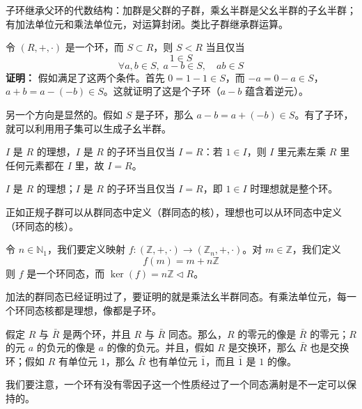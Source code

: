 \begin{note}[定义2 6子环]
子环继承父环的代数结构：加群是父群的子群，乘幺半群是父幺半群的子幺半群；有加法单位元和乘法单位元，对运算封闭。类比子群继承群运算。
\end{note}

\begin{lemma}[引理 2.1：子环等价条件]
令 $(R,+,\cdot)$ 是一个环，而 $S\subset R$，则 $S<R$ 当且仅当
\[
1\in S
\]
\[
\forall a,b\in S,\;a-b\in S,\quad ab\in S
\]
\textbf{证明：} 假如满足了这两个条件。首先 $0=1-1\in S$，而 $-a=0-a\in S$，$a+b=a-(-b)\in S$。这就证明了这是个子环（$a-b$ 蕴含着逆元）。

另一个方向是显然的。假如 $S$ 是子环，那么 $a-b=a+(-b)\in S$。有了子环，就可以利用用子集可以生成子幺半群。
\end{lemma}

\begin{lemma}[引理 2.2：理想是子环当且仅当理想是整个环]
$I$ 是 $R$ 的理想，$I$ 是 $R$ 的子环当且仅当 $I=R$：若 $1\in I$，则 $I$ 里元素左乘 $R$ 里任何元素都在 $I$ 里，故 $I=R$。
\end{lemma}

\begin{note}[引理2 2理想是子环当且仅当理想是整个环]
$I$ 是 $R$ 的理想；$I$ 是 $R$ 的子环当且仅当 $I=R$，即 $1\in I$ 时理想就是整个环。
\end{note}

\begin{lemma}[引理 2.3：理想可以从环同态中定义]
正如正规子群可以从群同态中定义（群同态的核），理想也可以从环同态中定义（环同态的核）。

令 $n\in\mathbb{N}_1$，我们要定义映射 $f:(\mathbb{Z},+,\cdot)\to(\mathbb{Z}_n,+,\cdot)$。对 $m\in\mathbb{Z}$，我们定义
\[
f(m)=m+n\mathbb{Z}
\]
则 $f$ 是一个环同态，而 $\ker(f)=n\mathbb{Z}\triangleleft R$。

加法的群同态已经证明过了，要证明的就是乘法幺半群同态。有乘法单位元，每一个环同态核都是理想，像都是子环。
\end{lemma}

\begin{theorem}
假定 $R$ 与 $\bar{R}$ 是两个环，并且 $R$ 与 $\bar{R}$ 同态。那么，$R$ 的零元的像是 $\bar{R}$ 的零元；$R$ 的元 $a$ 的负元的像是 $a$ 的像的负元。并且，假如 $R$ 是交换环，那么 $\bar{R}$ 也是交换环；假如 $R$ 有单位元 $1$，那么 $\bar{R}$ 也有单位元 $\bar{1}$，而且 $\bar{1}$ 是 $1$ 的像。

我们要注意，一个环有没有零因子这一个性质经过了一个同态满射是不一定可以保持的。
\end{theorem}


